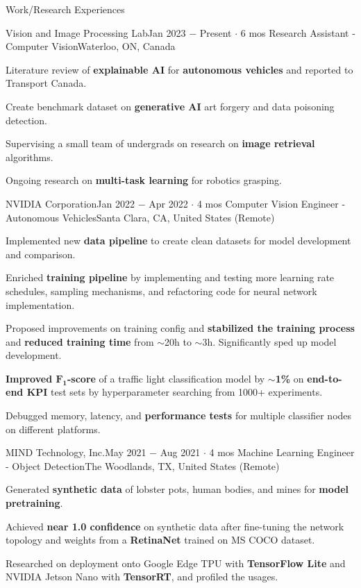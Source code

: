 \documentclass{resume}
\begin{document}
\begin{rSection}{Work/Research Experiences}

    \begin{rSubsection}{Vision and Image Processing Lab}{Jan 2023 \(-\) Present \(\cdot\) 6 mos}
        {Research Assistant - Computer Vision}{Waterloo, ON, Canada}
        \item Literature review of \textbf{explainable AI} for \textbf{autonomous vehicles} and reported to Transport Canada.
        \item Create benchmark dataset on \textbf{generative AI} art forgery and data poisoning detection.
        \item Supervising a small team of undergrads on research on \textbf{image retrieval} algorithms.
        \item Ongoing research on \textbf{multi-task learning} for robotics grasping.
    \end{rSubsection}

    \begin{rSubsection}{NVIDIA Corporation}{Jan 2022 \(-\) Apr 2022 \(\cdot\) 4 mos}
        {Computer Vision Engineer - Autonomous Vehicles}{Santa Clara, CA, United States (Remote)}
        \item Implemented new \textbf{data pipeline} to create clean datasets for model development and comparison.
        \item Enriched \textbf{training pipeline} by implementing and testing more learning rate schedules, sampling mechanisms, and refactoring code for neural network implementation.
        \item Proposed improvements on training config and \textbf{stabilized the training process} and \textbf{reduced training time} from \(\sim\)20h to \(\sim\)3h. Significantly sped up model development.
        \item \textbf{Improved \(\boldsymbol{F_{1}}\)-score} of a traffic light classification model by \(\sim\)\textbf{1\%} on \textbf{end-to-end KPI} test sets by hyperparameter searching from 1000+ experiments.
        \item Debugged memory, latency, and \textbf{performance tests} for multiple classifier nodes on different platforms.
    \end{rSubsection}

    \begin{rSubsection}{MIND Technology, Inc.}{May 2021 \(-\) Aug 2021 \(\cdot\) 4 mos}
        {Machine Learning Engineer - Object Detection}{The Woodlands, TX, United States (Remote)}
        \item Generated \textbf{synthetic data} of lobster pots, human bodies, and mines for \textbf{model pretraining}.
        \item Achieved \textbf{near 1.0 confidence} on synthetic data after fine-tuning the network topology and weights from a \textbf{RetinaNet} trained on MS COCO dataset.
        \item Researched on deployment onto Google Edge TPU with \textbf{TensorFlow Lite} and NVIDIA Jetson Nano with \textbf{TensorRT}, and profiled the usages.
    \end{rSubsection}


\end{rSection}
\end{document}
